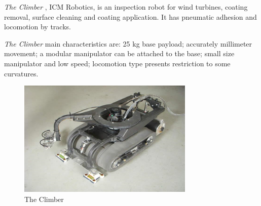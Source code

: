 


\emph{The Climber}%
, ICM Robotics, is an inspection robot for
wind turbines, coating removal, surface cleaning and coating application.
It has pneumatic adhesion and locomotion by tracks.

\emph{The Climber} main characteristics are: 25 kg base payload; accurately
millimeter movement; a modular manipulator can be attached to the base; small
size manipulator and low speed; locomotion type presents restriction to
some curvatures.

\begin{figure}[ht]
\centering
\includegraphics[width=8.4cm]{figs/climbers/icm.png}
\caption{The Climber}
\label{icm}
\end{figure}

